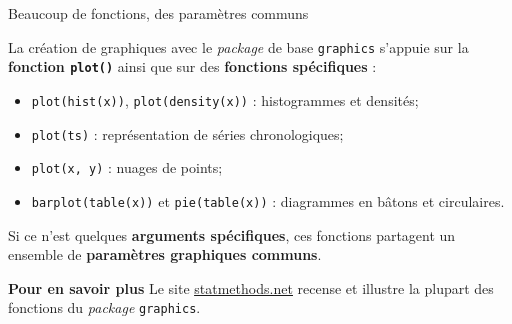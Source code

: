 \documentclass[12pt,ignorenonframetext,]{beamer}
\providecommand{\tightlist}{%
  \setlength{\itemsep}{0pt}\setlength{\parskip}{0pt}}
\newcommand{\intertitre}[1]{\textcolor{redInsee}{\textbf{#1}}}
\begin{document}
\begin{frame}[fragile]{\large Beaucoup de fonctions, des paramètres
communs}
\protect\hypertarget{beaucoup-de-fonctions-des-parametres-communs}{}

La création de graphiques avec le \emph{package} de base
\texttt{graphics} s’appuie sur la \textbf{fonction \texttt{plot()}}
ainsi que sur des \textbf{fonctions spécifiques} :

\begin{itemize}
\tightlist
\item
  \texttt{plot(hist(x))}, \texttt{plot(density(x))} : histogrammes et
  densités;
\item
  \texttt{plot(ts)} : représentation de séries chronologiques;
\item
  \texttt{plot(x,\ y)} : nuages de points;
\item
  \texttt{barplot(table(x))} et \texttt{pie(table(x))} : diagrammes en
  bâtons et circulaires.
\end{itemize}

\pause Si ce n’est quelques \textbf{arguments spécifiques}, ces
fonctions partagent un ensemble de \textbf{paramètres graphiques
communs}.

\pause

\intertitre{Pour en savoir plus} Le site
\href{http://www.statmethods.net/graphs/}{\underline{statmethods.net}}
recense et illustre la plupart des fonctions du \emph{package}
\texttt{graphics}.

\end{frame}
\end{document}
